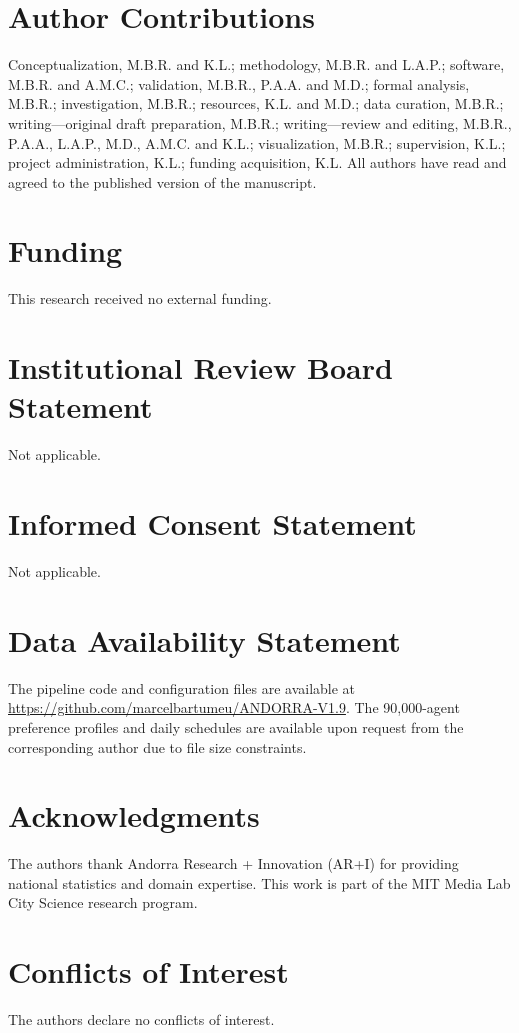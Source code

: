 \documentclass[a4paper,12pt]{article}
\begin{document}
\vspace{6pt}

\section*{Author Contributions}
Conceptualization, M.B.R. and K.L.; methodology, M.B.R. and L.A.P.;
software, M.B.R. and A.M.C.; validation, M.B.R., P.A.A. and M.D.;
formal analysis, M.B.R.; investigation, M.B.R.; resources, K.L. and M.D.;
data curation, M.B.R.; writing---original draft preparation, M.B.R.;
writing---review and editing, M.B.R., P.A.A., L.A.P., M.D., A.M.C. and K.L.;
visualization, M.B.R.; supervision, K.L.; project administration, K.L.;
funding acquisition, K.L. All authors have read and agreed to the published
version of the manuscript.

\section*{Funding}
This research received no external funding.

\section*{Institutional Review Board Statement}
Not applicable.

\section*{Informed Consent Statement}
Not applicable.

\section*{Data Availability Statement}
The pipeline code and configuration files are available at
\url{https://github.com/marcelbartumeu/ANDORRA-V1.9}. The 90,000-agent
preference profiles and daily schedules are available upon request from
the corresponding author due to file size constraints.

\section*{Acknowledgments}
The authors thank Andorra Research + Innovation (AR+I) for providing
national statistics and domain expertise. This work is part of the MIT
Media Lab City Science research program.

\section*{Conflicts of Interest}
The authors declare no conflicts of interest.
\end{document}
